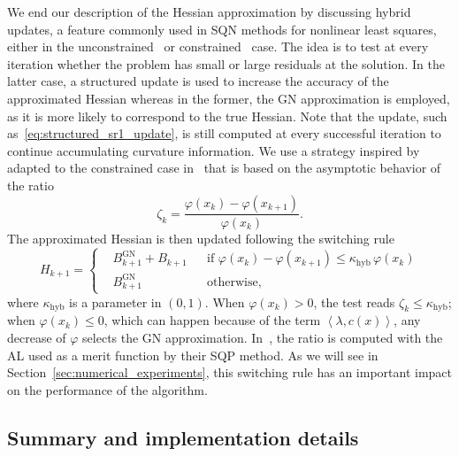 \documentclass{article}
\numberwithin{equation}{section}
\newcommand{\inner}[2]{\left\langle {#1} , {#2} \right\rangle} %
\newcommand{\rev}[1]{#1}
\theoremstyle{plain}
\begin{document}
We end our description of the Hessian approximation by discussing hybrid updates, a feature commonly used in SQN methods for nonlinear least squares, either in the unconstrained~\cite{dennisetal:1981,albaalifletcher:1985,fletcherxu:1987} or constrained~\cite{tjoabiegler:1991,li-etal:2002} case. The idea is to test at every iteration whether the problem has small or large residuals at the solution. In the latter case, a structured update is used to increase the accuracy of the approximated Hessian whereas in the former, the GN approximation is employed, as it is more likely to correspond to the true Hessian. Note that the update, such as~\eqref{eq:structured_sr1_update}, is still computed at every successful iteration to continue accumulating curvature information. We use a strategy inspired by~\cite{fletcherxu:1987} adapted to the constrained case in~\cite{tjoabiegler:1991} that is based on the asymptotic behavior of the ratio
\begin{equation*}
	\zeta_k = \dfrac{\varphi(x_{k})-\varphi(x_{k+1})}{\varphi(x_{k})}.
\end{equation*}
The approximated Hessian is then updated following the switching rule
\begin{equation}\label{eq:hybrid_update_strategy}
	H_{k+1} = \left\{\begin{aligned}
		&B^{\mathrm{GN}}_{k+1} + B_{k+1} & &\text{if } \rev{\varphi(x_k)-\varphi(x_{k+1}) \le \kappa_{\mathrm{hyb}}\,\varphi(x_k)} \\
		&B^{\mathrm{GN}}_{k+1}  & & \text{otherwise}, 
	\end{aligned}\right.
\end{equation}
where $\kappa_{\mathrm{hyb}}$ is a parameter in $(0,1)$. \rev{When $\varphi(x_k) > 0$, the test reads $\zeta_k \le \kappa_{\mathrm{hyb}}$; when $\varphi(x_k) \le 0$, which can happen because of the term $\inner{\lambda}{c(x)}$, any decrease of $\varphi$ selects the GN approximation.} In~\cite{tjoabiegler:1991}, the ratio is computed with the AL used as a merit function by their SQP method. As we will see in Section~\ref{sec:numerical_experiments}, this switching rule has an important impact on the performance of the algorithm.

	\subsection{Summary and implementation details}\label{subsec:implementation_details}
\end{document}
